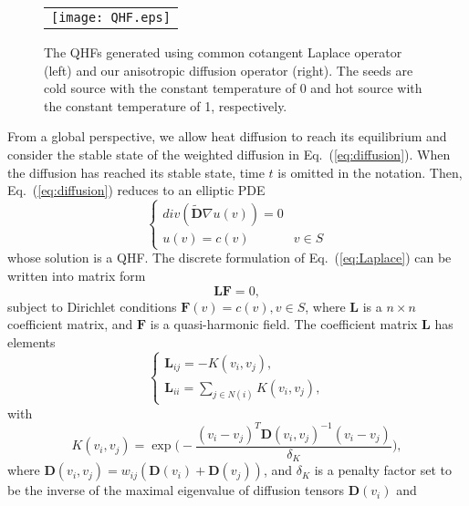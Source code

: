 \documentclass[10pt,journal,cspaper,compsoc]{IEEEtran}
\begin{document}
\begin{figure}
\begin{center}
\begin{tabular}{@{}c@{}}
\texttt{[image: QHF.eps]} \\
\end{tabular}
\caption{The QHFs generated using common cotangent Laplace operator
(left) and our anisotropic diffusion operator (right). The seeds are
cold source with the constant temperature of 0 and hot source with the
constant temperature of 1, respectively.}
\label{fig:QHF}
\end{center}
\end{figure}

From a global perspective, we allow heat diffusion to reach its
equilibrium and consider the stable state of the weighted diffusion in
Eq.~(\ref{eq:diffusion}). When the diffusion has reached its stable
state, time $t$ is omitted in the notation. Then,
Eq.~(\ref{eq:diffusion}) reduces to an elliptic PDE
\begin{equation}\label{eq:Laplace}
\begin{cases}
div(\widetilde{\textbf{D}} \nabla u(v))=0\\
u(v)=c(v) & v\in S
\end{cases}
\end{equation}
whose solution is a QHF. The discrete formulation of
Eq.~(\ref{eq:Laplace}) can be written into matrix form
\begin{equation}\label{eq:Linear}
\textbf{L}\textbf{F}=0,
\end{equation}
subject to Dirichlet conditions $\textbf{F}(v)=c(v), v \in S$, where
$\textbf{L}$ is a $n\times n$ coefficient matrix, and $\textbf{F}$ is
a quasi-harmonic field. The coefficient matrix $\textbf{L}$ has
elements
\begin{equation}
\begin{cases}
\textbf{L}_{ij}=-K(v_i,v_j),\\
\textbf{L}_{ii}=\sum_{j\in {N(i)}}K(v_i,v_j),
\end{cases}
\end{equation}
with
\begin{equation}\label{eq:K}
K(v_i,v_j)=\exp\Big(-\frac{(v_i-v_j)^T \textbf{D}(v_i,v_j)^{-1}(v_i-v_j)}{{\delta}_K}\Big),
\end{equation}
where $\textbf{D}(v_i,v_j)=w_{ij}(\textbf{D}(v_i)+\textbf{D}(v_j))$,
and $\delta_K$ is a penalty factor set to be the inverse of the
maximal eigenvalue of diffusion tensors $\textbf{D}(v_i)$ and
\end{document}
